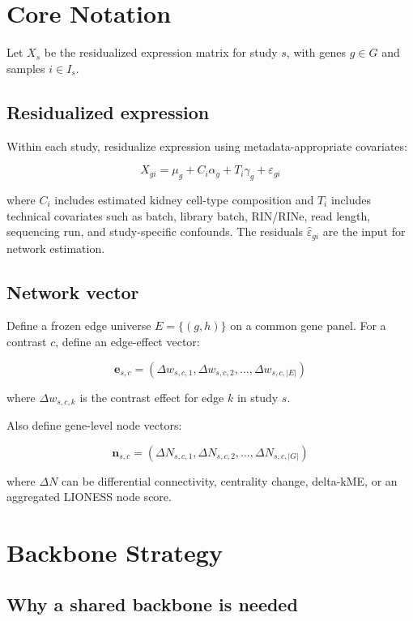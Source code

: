 \documentclass[11pt]{article}
\begin{document}
\section{Core Notation}

Let $X_s$ be the residualized expression matrix for study $s$, with genes
$g \in G$ and samples $i \in I_s$.

\subsection{Residualized expression}

Within each study, residualize expression using metadata-appropriate covariates:

\[
X_{g i} = \mu_g + C_i \alpha_g + T_i \gamma_g + \varepsilon_{g i}
\]

where $C_i$ includes estimated kidney cell-type composition and $T_i$ includes
technical covariates such as batch, library batch, RIN/RINe, read length,
sequencing run, and study-specific confounds. The residuals
$\hat{\varepsilon}_{g i}$ are the input for network estimation.

\subsection{Network vector}

Define a frozen edge universe $E = \{(g,h)\}$ on a common gene panel. For a
contrast $c$, define an edge-effect vector:

\[
\mathbf{e}_{s,c} =
\left( \Delta w_{s,c,1}, \Delta w_{s,c,2}, \ldots, \Delta w_{s,c,|E|} \right)
\]

where $\Delta w_{s,c,k}$ is the contrast effect for edge $k$ in study $s$.

Also define gene-level node vectors:

\[
\mathbf{n}_{s,c} =
\left( \Delta N_{s,c,1}, \Delta N_{s,c,2}, \ldots, \Delta N_{s,c,|G|} \right)
\]

where $\Delta N$ can be differential connectivity, centrality change, delta-kME,
or an aggregated LIONESS node score.

\section{Backbone Strategy}

\subsection{Why a shared backbone is needed}
\end{document}
